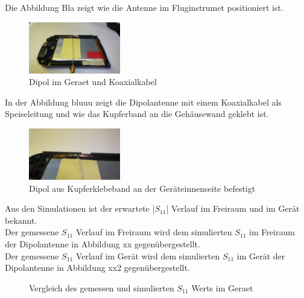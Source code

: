 Die Abbildung Bla zeigt wie die Antenne im Fluginstrumet positioniert ist.\\
\begin{figure}[!ht]
	\centering
	\includegraphics[width=4cm]{content/bilder/Implementierung/DipolKabelGeraet.jpg}%
	\caption{Dipol im Geraet und Koaxialkabel}
	\label{fig:DipolimGeraet}
\end{figure}
In der Abbildung bluuu zeigt die Dipolantenne mit einem Koaxialkabel als Speiseleitung und wie das Kupferband an die Gehäusewand geklebt ist.\\
\begin{figure}[!ht]
	\centering
	\includegraphics[width=4cm]{content/bilder/Implementierung/DipolIMGeraet.jpg}%
	\caption{Dipol aus Kupferklebeband an der Geräteinnenseite befestigt}
	\label{fig:DipolausKupferband}
\end{figure}

Aus den Simulationen ist der erwartete |$S_{11}$| Verlauf im Freiraum und im Gerät bekannt.\\

Der gemessene $S_{11}$ Verlauf im Freiraum wird dem simulierten $S_{11}$ im Freiraum der Dipolantenne in Abbildung xx gegenübergestellt.\\
%	

Der gemessene $S_{11}$ Verlauf im Gerät wird dem simulierten $S_{11}$ im Gerät der Dipolantenne in Abbildung xx2 gegenübergestellt.\\
\begin{figure}[!ht]
	\centering
	\begingroup
	
	\endgroup
	\caption{Vergleich des gemessen und simulierten $S_{11}$ Werts im Geraet}	\label{S11_Messung_Simulation_Dipolantenn_Freiraum}
\end{figure}

